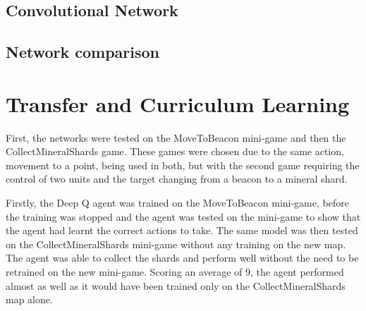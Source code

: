 \subsection{Convolutional Network}

\subsection{Network comparison}


\section{Transfer and Curriculum Learning}

First, the networks were tested on the MoveToBeacon mini-game and then the
CollectMineralShards game. These games were chosen due to the same action,
movement to a point, being used in both, but with the second game requiring the
control of two units and the target changing from a beacon to a mineral shard.

Firstly, the Deep Q agent was trained on the MoveToBeacon mini-game, before the
training was stopped and the agent was tested on the mini-game to show that the
agent had learnt the correct actions to take. The same model was then tested on
the CollectMineralShards mini-game without any training on the new map. The
agent was able to collect the shards and perform well without the need to be
retrained on the new mini-game. Scoring an average of 9, the agent performed
almost as well as it would have been trained only on the CollectMineralShards
map alone.


